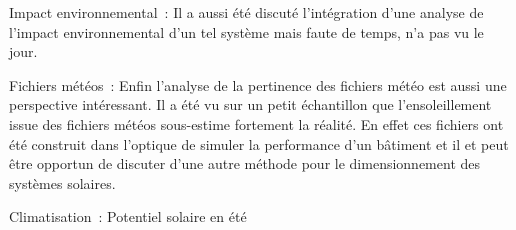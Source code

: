 Impact environnemental~:
Il a aussi été discuté l’intégration d’une analyse de l’impact environnemental
d’un tel système mais faute de temps, n’a pas vu le jour.

Fichiers météos~:
Enfin l’analyse de la pertinence des fichiers météo est aussi une perspective intéressant.
Il a été vu sur un petit échantillon que l’ensoleillement issue des fichiers météos
sous-estime fortement la réalité. En effet ces fichiers ont été construit dans l’optique
de simuler la performance d’un bâtiment et il et peut être opportun de discuter d’une
autre méthode pour le dimensionnement des systèmes solaires.


Climatisation~:
Potentiel solaire en été
